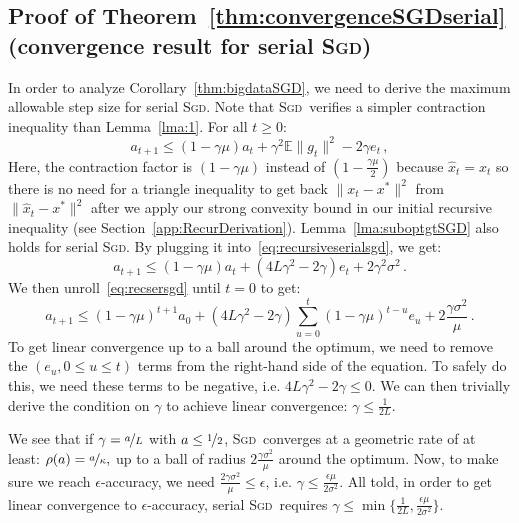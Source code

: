 \documentclass[twoside, 11pt]{article}
\newcommand{\stepsize}{\gamma}
\newcommand{\strongconvex}{\mu}
\newcommand{\contraction}{\rho}
\newcommand{\lipschitz}{L}
\newcommand{\E}{\mathbb{E}}
\newcommand{\SGD}{\textsc{Sgd}}
\begin{document}
\subsection{Proof of Theorem~\ref{thm:convergenceSGDserial} (convergence result for serial \SGD) }\label{apx:sgdsgd}
In order to analyze Corollary~\ref{thm:bigdataSGD}, we need to derive the maximum allowable step size for serial \SGD.
Note that \SGD\ verifies a simpler contraction inequality than Lemma~\ref{lma:1}.
For all $t \geq 0$:
\begin{equation} \label{eq:recursiveserialsgd}
a_{t+1} \leq
(1 - \stepsize\strongconvex) a_t + \stepsize^2 \E\|g_t\|^2 - 2\stepsize e_t  \, ,
\end{equation}
Here, the contraction factor is $(1 - \stepsize\strongconvex)$ instead of $(1 - \frac{\stepsize \strongconvex}{2})$ because $\hat x_t = x_t$ so there is no need for a triangle inequality to get back $\|x_t - x^*\|^2$ from $\|\hat x_t - x^*\|^2$ after we apply our strong convexity bound in our initial recursive inequality (see Section~\ref{app:RecurDerivation}).
Lemma~\ref{lma:suboptgtSGD} also holds for serial \SGD.
By plugging it into~\eqref{eq:recursiveserialsgd}, we get:
\begin{equation}\label{eq:recsersgd}
a_{t+1}
\leq (1 - \stepsize\strongconvex)a_t
+ (4\lipschitz \stepsize^2 - 2\stepsize) e_t
+ 2 \stepsize^2 \sigma^2\,.
\end{equation}
We then unroll~\eqref{eq:recsersgd} until $t=0$ to get:
\begin{equation}
a_{t+1}
\leq (1 - \stepsize\strongconvex)^{t+1} a_0
+ (4\lipschitz \stepsize^2 - 2\stepsize) \sum_{u = 0}^t (1 - \stepsize\strongconvex)^{t-u} e_u
+ 2 \frac{\stepsize \sigma^2}{\strongconvex}\,.
\end{equation}
To get linear convergence up to a ball around the optimum, we need to remove the $(e_u, 0\leq u \leq t)$ terms from the right-hand side of the equation.
To safely do this, we need these terms to be negative, i.e. $4\lipschitz \stepsize^2 - 2\stepsize \leq 0$.
We can then trivially derive the condition on $\stepsize$ to achieve linear convergence: $\stepsize \leq \frac{1}{2 \lipschitz}$.

We see that if $\stepsize = \nicefrac{a}{\lipschitz}$ with $a \leq \nicefrac{1}{2}$, \SGD\ converges at a geometric rate of at least: $\contraction(a) = \nicefrac{a}{\kappa},$ up to a ball of radius $2 \frac{\stepsize \sigma^2}{\strongconvex}$ around the optimum.
Now, to make sure we reach $\epsilon$-accuracy, we need $\frac{2 \stepsize \sigma^2}{\strongconvex} \leq \epsilon$, i.e. $\stepsize \leq \frac{\epsilon \strongconvex}{2\sigma^2}$.
All told, in order to get linear convergence to $\epsilon$-accuracy, serial \SGD\ requires $\stepsize \leq \min \big\{\frac{1}{2\lipschitz}, \frac{\epsilon \strongconvex}{2\sigma^2}\big\}$.
\end{document}
